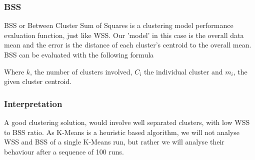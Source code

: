 \documentclass[11pt]{article}
\begin{document}
	 			\subsubsection*{BSS}
		 			BSS or  Between Cluster Sum of Squares is a clustering model performance evaluation function, just like WSS. Our 'model' in this case is the overall data mean and the error is the distance of each cluster's centroid to the overall mean. BSS can be evaluated with the following formula\cite{???}

		 			Where $k$, the number of clusters involved, $C_i$ the individual cluster and $m_i$, the given cluster centroid.
		 		\subsubsection*{Interpretation}
		 			A good clustering solution, would involve well separated clusters, with low WSS to BSS ratio\cite{???}. As K-Means is a heuristic based algorithm, we will not analyse WSS and BSS of a single K-Means run, but rather we will analyse their behaviour after a sequence of 100 runs. 
		 			\iffalse
\end{document}
